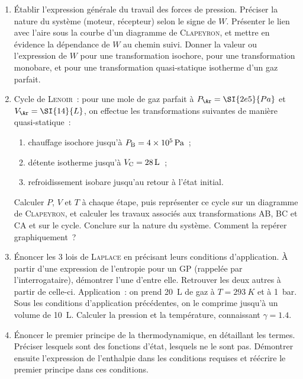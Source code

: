 \documentclass[a4paper, 12pt, final, garamond]{book}
\begin{document}
\begin{enumerate}[label=\sqenumi]
    \item Établir l'expression générale du travail des forces de pression.
      Préciser la nature du système (moteur, récepteur) selon le signe de $W$.
      Présenter le lien avec l'aire sous la courbe d'un diagramme de
      \textsc{Clapeyron}, et mettre en évidence la dépendance de $W$ au chemin
      suivi. Donner la valeur ou l'expression de $W$ pour une transformation
      isochore, pour une transformation monobare, et pour une transformation
      quasi-statique isotherme d'un gaz parfait.

    \item Cycle de \textsc{Lenoir}~: pour une mole de gaz parfait à $P_\Ar =
      \SI{2e5}{Pa}$ et $V_\Ar = \SI{14}{L}$, on effectue les transformations
      suivantes de manière quasi-statique~:
      \begin{enumerate}[label=\alph*)]
        \item chauffage isochore jusqu'à $P_{\rm B} = \SI{4e5}{Pa}$~;
        \item détente isotherme jusqu'à $V_{\rm C} = \SI{28}{L}$~;
        \item refroidissement isobare jusqu'au retour à l'état initial.
      \end{enumerate}
      Calculer $P$, $V$ et $T$ à chaque étape, puis représenter ce cycle sur un
      diagramme de \textsc{Clapeyron}, et calculer les travaux associés aux
      transformations AB, BC et CA et sur le cycle. Conclure sur la nature du
      système. Comment la repérer graphiquement~?

    \item Énoncer les 3 lois de \textsc{Laplace} en précisant leurs conditions
      d'application. À partir d'une expression de l'entropie pour un GP
      (rappelée par l'interrogataire), démontrer l'une d'entre elle. Retrouver
      les deux autres à partir de celle-ci. Application~: on prend \SI{20}{L} de
      gaz à $T = \SI{293}{K}$ et à \SI{1}{bar}. Sous les conditions
      d'application précédentes, on le comprime jusqu'à un volume de \SI{10}{L}.
      Calculer la pression et la température, connaissant $\gamma = \num{1.4}$.

    \item Énoncer le premier principe de la thermodynamique, en détaillant les
      termes. Préciser lesquels sont des fonctions d'état, lesquels ne le sont
      pas. Démontrer ensuite l'expression de l'enthalpie dans les conditions
      requises et réécrire le premier principe dans ces conditions.


\end{enumerate}
\end{document}
